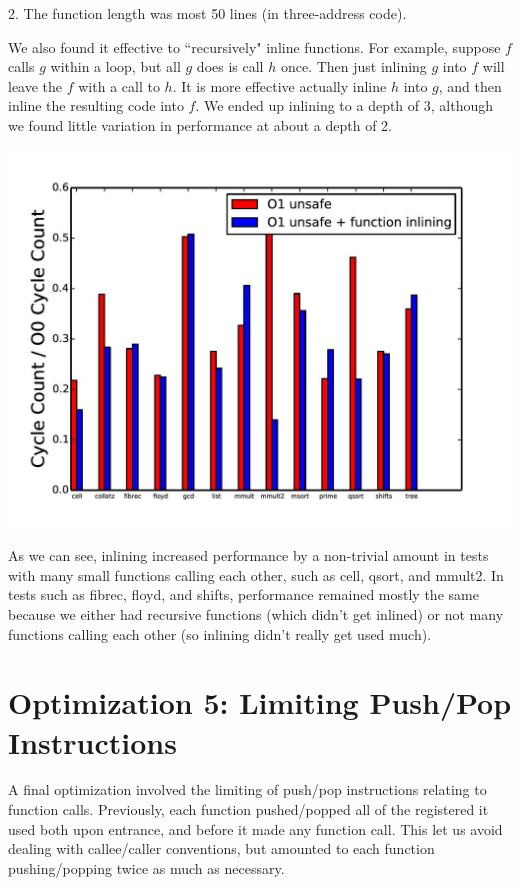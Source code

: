 \documentclass{article}
\begin{document}
2. The function length was most 50 lines (in three-address code).

\noindent We also found it effective to ``recursively" inline functions. For example, suppose $f$ calls $g$ within a loop, but all $g$ does is call $h$ once. Then just inlining $g$ into $f$ will leave the $f$ with a call to $h$. It is more effective actually inline $h$ into $g$, and then inline the resulting code into $f$. We ended up inlining to a depth of 3, although we found little variation in performance at about a depth of 2.

\includegraphics[scale=0.5]{O1_vs_inlining-page-001}

As we can see, inlining increased performance by a non-trivial amount in tests with many small functions calling each other, such as cell, qsort, and mmult2. In tests such as fibrec, floyd, and shifts, performance remained mostly the same because we either had recursive functions (which didn't get inlined) or not many functions calling each other (so inlining didn't really get used much). 

\section{Optimization 5: Limiting Push/Pop Instructions}

A final optimization involved the limiting of push/pop instructions relating to function calls. Previously, each function pushed/popped all of the registered it used both upon entrance, and before it made any function call. This let us avoid dealing with callee/caller conventions, but amounted to each function pushing/popping twice as much as necessary.
\end{document}
